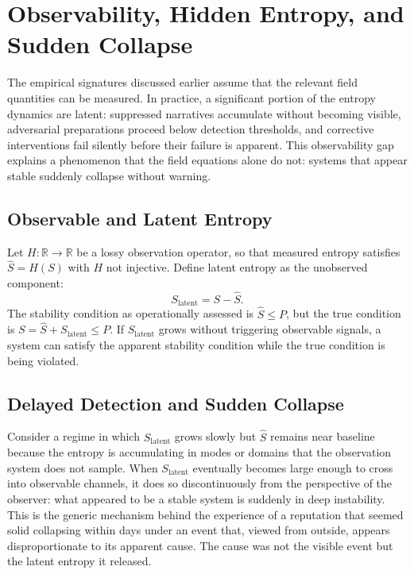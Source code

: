 \documentclass[12pt,a4paper]{article}
\begin{document}
\section{Observability, Hidden Entropy, and Sudden Collapse}

The empirical signatures discussed earlier assume that the relevant field quantities can be measured. In practice, a significant portion of the entropy dynamics are latent: suppressed narratives accumulate without becoming visible, adversarial preparations proceed below detection thresholds, and corrective interventions fail silently before their failure is apparent. This observability gap explains a phenomenon that the field equations alone do not: systems that appear stable suddenly collapse without warning.

\subsection{Observable and Latent Entropy}

Let $H : \mathbb{R} \to \mathbb{R}$ be a lossy observation operator, so that measured entropy satisfies $\hat{S} = H(S)$ with $H$ not injective. Define latent entropy as the unobserved component:
\[
S_{\text{latent}} = S - \hat{S}.
\]
The stability condition as operationally assessed is $\hat{S} \leq P$, but the true condition is $S = \hat{S} + S_{\text{latent}} \leq P$. If $S_{\text{latent}}$ grows without triggering observable signals, a system can satisfy the apparent stability condition while the true condition is being violated.

\subsection{Delayed Detection and Sudden Collapse}

Consider a regime in which $S_{\text{latent}}$ grows slowly but $\hat{S}$ remains near baseline because the entropy is accumulating in modes or domains that the observation system does not sample. When $S_{\text{latent}}$ eventually becomes large enough to cross into observable channels, it does so discontinuously from the perspective of the observer: what appeared to be a stable system is suddenly in deep instability. This is the generic mechanism behind the experience of a reputation that seemed solid collapsing within days under an event that, viewed from outside, appears disproportionate to its apparent cause. The cause was not the visible event but the latent entropy it released.
\end{document}
